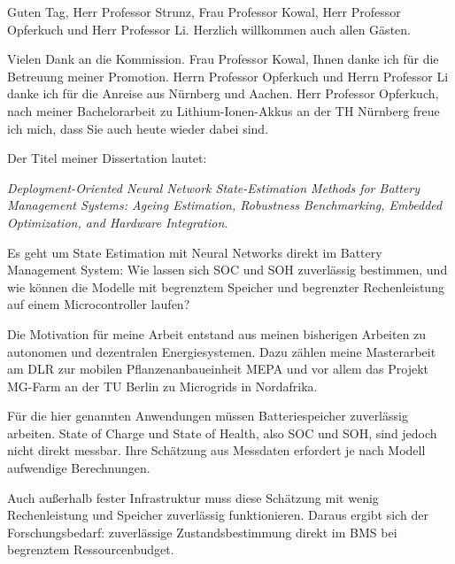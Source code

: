 
\begin{sprechtext}

Guten Tag, Herr Professor Strunz, Frau Professor Kowal, Herr Professor Opferkuch und Herr Professor Li. Herzlich willkommen auch allen Gästen.

Vielen Dank an die Kommission. Frau Professor Kowal, Ihnen danke ich für die Betreuung meiner Promotion. Herrn Professor Opferkuch und Herrn Professor Li danke ich für die Anreise aus Nürnberg und Aachen. Herr Professor Opferkuch, nach meiner Bachelorarbeit zu Lithium-Ionen-Akkus an der TH Nürnberg freue ich mich, dass Sie auch heute wieder dabei sind.

Der Titel meiner Dissertation lautet:

\foreignlanguage{english}{\emph{Deployment-Oriented Neural Network State-Estimation Methods for Battery Management Systems: Ageing Estimation, Robustness Benchmarking, Embedded Optimization, and Hardware Integration.}}

Es geht um State Estimation mit Neural Networks direkt im Battery Management System: Wie lassen sich SOC und SOH zuverlässig bestimmen, und wie können die Modelle mit begrenztem Speicher und begrenzter Rechenleistung auf einem Microcontroller laufen?

\end{sprechtext}


\begin{sprechtext}

Die Motivation für meine Arbeit entstand aus meinen bisherigen Arbeiten zu autonomen und dezentralen Energiesystemen. Dazu zählen meine Masterarbeit am DLR zur mobilen Pflanzenanbaueinheit MEPA und vor allem das Projekt MG-Farm an der TU Berlin zu Microgrids in Nordafrika.

Für die hier genannten Anwendungen müssen Batteriespeicher zuverlässig arbeiten. State of Charge und State of Health, also SOC und SOH, sind jedoch nicht direkt messbar. Ihre Schätzung aus Messdaten erfordert je nach Modell aufwendige Berechnungen.

Auch außerhalb fester Infrastruktur muss diese Schätzung mit wenig Rechenleistung und Speicher zuverlässig funktionieren. Daraus ergibt sich der Forschungsbedarf: zuverlässige Zustandsbestimmung direkt im BMS bei begrenztem Ressourcenbudget.

\end{sprechtext}

